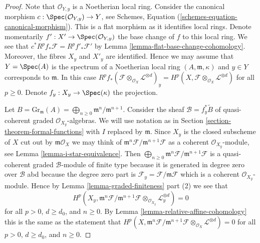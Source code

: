 \begin{proof}
Note that $\mathcal{O}_{Y, y}$ is a Noetherian local ring.
Consider the canonical morphism
$c : \Spec(\mathcal{O}_{Y, y}) \to Y$, see
Schemes, Equation (\ref{schemes-equation-canonical-morphism}).
This is a flat morphism as it identifies local rings.
Denote momentarily $f' : X' \to \Spec(\mathcal{O}_{Y, y})$
the base change of $f$ to this local ring. We see that
$c^*R^pf_*\mathcal{F} = R^pf'_*\mathcal{F}'$ by
Lemma \ref{lemma-flat-base-change-cohomology}.
Moreover, the fibres $X_y$ and $X'_y$ are identified.
Hence we may assume that $Y = \Spec(A)$ is the spectrum of
a Noetherian local ring $(A, \mathfrak m, \kappa)$ and $y \in Y$
corresponds to $\mathfrak m$. In this case
$R^pf_*(\mathcal{F} \otimes_{\mathcal{O}_X} \mathcal{L}^{\otimes d})_y =
H^p(X, \mathcal{F} \otimes_{\mathcal{O}_X} \mathcal{L}^{\otimes d})$
for all $p \geq 0$. Denote $f_y : X_y \to \Spec(\kappa)$ the projection.

\medskip\noindent
Let $B = \text{Gr}_\mathfrak m(A) =
\bigoplus_{n \geq 0} \mathfrak m^n/\mathfrak m^{n + 1}$.
Consider the sheaf $\mathcal{B} = f_y^*\widetilde{B}$
of quasi-coherent graded $\mathcal{O}_{X_y}$-algebras.
We will use notation as in Section \ref{section-theorem-formal-functions}
with $I$ replaced by $\mathfrak m$.
Since $X_y$ is the closed subscheme of $X$ cut out by
$\mathfrak m\mathcal{O}_X$ we may think of
$\mathfrak m^n\mathcal{F}/\mathfrak m^{n + 1}\mathcal{F}$
as a coherent $\mathcal{O}_{X_y}$-module, see
Lemma \ref{lemma-i-star-equivalence}. Then
$\bigoplus_{n \geq 0} \mathfrak m^n\mathcal{F}/\mathfrak m^{n + 1}\mathcal{F}$
is a quasi-coherent graded $\mathcal{B}$-module of finite type
because it is generated in degree zero over $\mathcal{B}$
abd because the degree zero part is
$\mathcal{F}_y = \mathcal{F}/\mathfrak m \mathcal{F}$
which is a coherent $\mathcal{O}_{X_y}$-module.
Hence by Lemma \ref{lemma-graded-finiteness} part (2)
we see that
$$
H^p(X_y, \mathfrak m^n \mathcal{F}/ \mathfrak m^{n + 1}\mathcal{F}
\otimes_{\mathcal{O}_{X_y}} \mathcal{L}_y^{\otimes d}) = 0
$$
for all $p > 0$, $d \geq d_0$, and $n \geq 0$. By
Lemma \ref{lemma-relative-affine-cohomology}
this is the same as the statement that
$
H^p(X, \mathfrak m^n \mathcal{F}/ \mathfrak m^{n + 1}\mathcal{F}
\otimes_{\mathcal{O}_X} \mathcal{L}^{\otimes d}) = 0
$
for all $p > 0$, $d \geq d_0$, and $n \geq 0$.


\end{proof}
